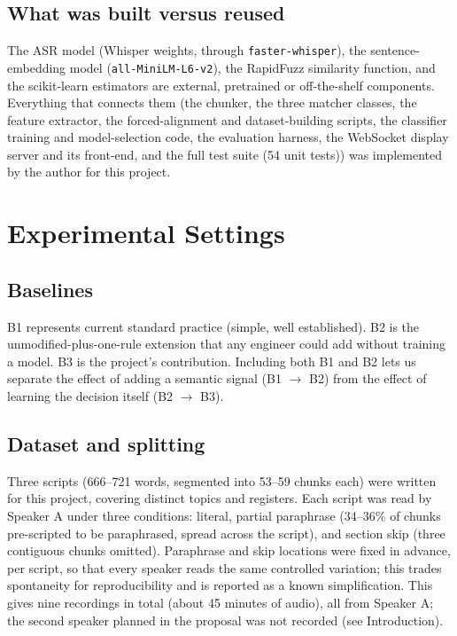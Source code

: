 \documentclass[conference,a4paper]{IEEEtran}
\begin{document}
\subsection{What was built versus reused}
The ASR model (Whisper weights, through \texttt{faster-whisper}), the sentence-embedding model (\texttt{all-MiniLM-L6-v2}), the RapidFuzz similarity function, and the scikit-learn estimators are external, pretrained or off-the-shelf components. Everything that connects them (the chunker, the three matcher classes, the feature extractor, the forced-alignment and dataset-building scripts, the classifier training and model-selection code, the evaluation harness, the WebSocket display server and its front-end, and the full test suite (54 unit tests)) was implemented by the author for this project.

\section{Experimental Settings}
\subsection{Baselines}
B1 represents current standard practice (simple, well established). B2 is the unmodified-plus-one-rule extension that any engineer could add without training a model. B3 is the project's contribution. Including both B1 and B2 lets us separate the effect of adding a semantic signal (B1 $\rightarrow$ B2) from the effect of learning the decision itself (B2 $\rightarrow$ B3).

\subsection{Dataset and splitting}
Three scripts (666--721 words, segmented into 53--59 chunks each) were written for this project, covering distinct topics and registers. Each script was read by Speaker A under three conditions: literal, partial paraphrase (34--36\% of chunks pre-scripted to be paraphrased, spread across the script), and section skip (three contiguous chunks omitted). Paraphrase and skip locations were fixed in advance, per script, so that every speaker reads the same controlled variation; this trades spontaneity for reproducibility and is reported as a known simplification. This gives nine recordings in total (about 45 minutes of audio), all from Speaker A; the second speaker planned in the proposal was not recorded (see Introduction).
\end{document}
